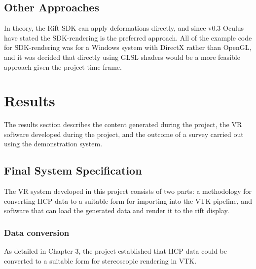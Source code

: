 \documentclass[MSc,paper=a4,pagesize=auto]{icldt}
\begin{document}
\section{Other Approaches}
In theory, the Rift SDK can apply deformations directly, and since v0.3 Oculus have stated the SDK-rendering is the preferred approach. All of the example code for SDK-rendering was for a Windows system with DirectX rather than OpenGL, and it was decided that directly using GLSL shaders would be a more feasible approach given the project time frame. 

\chapter{Results}
The results section describes the content generated during the project, the VR software developed during the project, and the outcome of a survey carried out using the demonstration system.

\clearpage
\section{Final System Specification}
The VR system developed in this project consists of two parts: a methodology for converting HCP data to a suitable form for importing into the VTK pipeline, and software that can load the generated data and render it to the rift display. 

\subsection{Data conversion}
As detailed in Chapter 3, the project established that HCP data could be converted to a suitable form for stereoscopic rendering in VTK. 
\end{document}
